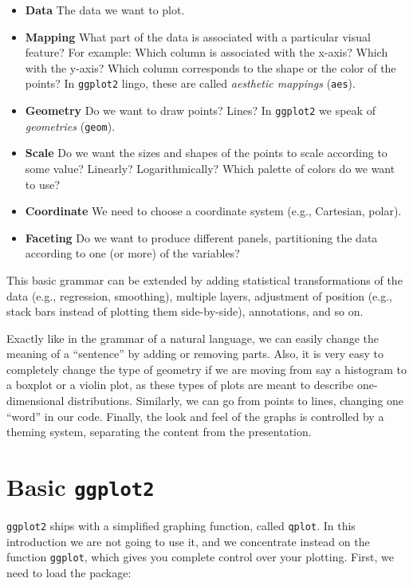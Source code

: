 \documentclass[
  letterpaper,
  DIV=11,
  numbers=noendperiod]{scrreprt}
\begin{document}
\begin{itemize}
\item
  \textbf{Data} The data we want to plot.
\item
  \textbf{Mapping} What part of the data is associated with a particular
  visual feature? For example: Which column is associated with the
  x-axis? Which with the y-axis? Which column corresponds to the shape
  or the color of the points? In \texttt{ggplot2} lingo, these are
  called \emph{aesthetic mappings} (\texttt{aes}).
\item
  \textbf{Geometry} Do we want to draw points? Lines? In
  \texttt{ggplot2} we speak of \emph{geometries} (\texttt{geom}).
\item
  \textbf{Scale} Do we want the sizes and shapes of the points to scale
  according to some value? Linearly? Logarithmically? Which palette of
  colors do we want to use?
\item
  \textbf{Coordinate} We need to choose a coordinate system (e.g.,
  Cartesian, polar).
\item
  \textbf{Faceting} Do we want to produce different panels, partitioning
  the data according to one (or more) of the variables?
\end{itemize}

This basic grammar can be extended by adding statistical transformations
of the data (e.g., regression, smoothing), multiple layers, adjustment
of position (e.g., stack bars instead of plotting them side-by-side),
annotations, and so on.

Exactly like in the grammar of a natural language, we can easily change
the meaning of a ``sentence'' by adding or removing parts. Also, it is
very easy to completely change the type of geometry if we are moving
from say a histogram to a boxplot or a violin plot, as these types of
plots are meant to describe one-dimensional distributions. Similarly, we
can go from points to lines, changing one ``word'' in our code. Finally,
the look and feel of the graphs is controlled by a theming system,
separating the content from the presentation.

\hypertarget{basic-ggplot2}{%
\section{\texorpdfstring{Basic
\texttt{ggplot2}}{Basic ggplot2}}\label{basic-ggplot2}}

\texttt{ggplot2} ships with a simplified graphing function, called
\texttt{qplot}. In this introduction we are not going to use it, and we
concentrate instead on the function \texttt{ggplot}, which gives you
complete control over your plotting. First, we need to load the package:
\end{document}
